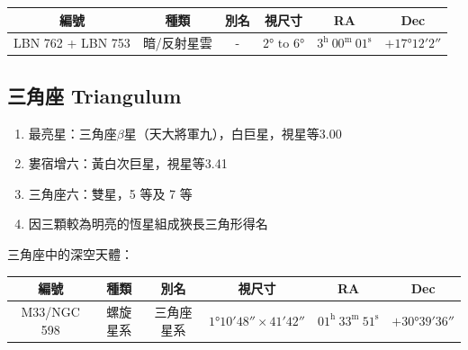 \begin{center}
\begin{longtable}{c | c | c | c | c | c}
    編號 & 種類 & 別名 & 視尺寸 & RA & Dec \\
    \hline
    \endfirsthead


    \endfoot

    \endlastfoot

    LBN 762 + LBN 753 & 暗/反射星雲 & - & \(\ang{2;;}\text{ to }\ang{6;;}\) & \(3^\text{h }00^\text{m }01^\text{s}\) & \(+\ang{17;12;2}\) \\ %
\end{longtable}
\end{center}

\subsection{三角座 Triangulum}
\begin{enumerate}
    \item 最亮星：三角座\(\beta\)星（天大將軍九），白巨星，視星等3.00
    \item 婁宿增六：黃白次巨星，視星等3.41
    \item 三角座六：雙星，5 等及 7 等
    \item 因三顆較為明亮的恆星組成狹長三角形得名
\end{enumerate}
三角座中的深空天體：
\newline

\begin{center}
\begin{longtable}{c | c | c | c | c | c}
    編號 & 種類 & 別名 & 視尺寸 & RA & Dec \\
    \hline
    \endfirsthead


    \endfoot

    \endlastfoot

    M33/NGC 598 & 螺旋星系 & 三角座星系 & \(\ang{1;10;48}\times\ang{;41;42}\) & \(01^\text{h }33^\text{m }51^\text{s}\) & \(+\ang{30;39;36}\) \\ %
\end{longtable}
\end{center}

